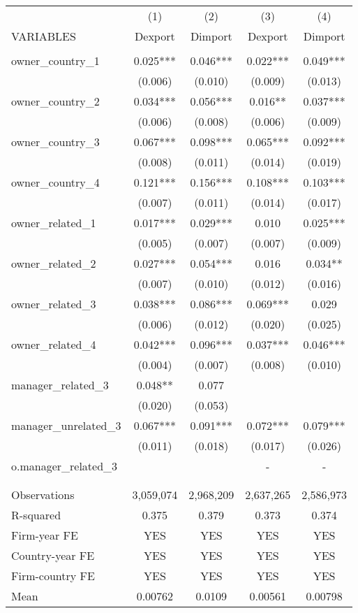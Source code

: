 \begin{tabular}{lcccc} \hline
 & (1) & (2) & (3) & (4) \\
VARIABLES & Dexport & Dimport & Dexport & Dimport \\ \hline
 &  &  &  &  \\
owner\_country\_1 & 0.025*** & 0.046*** & 0.022*** & 0.049*** \\
 & (0.006) & (0.010) & (0.009) & (0.013) \\
owner\_country\_2 & 0.034*** & 0.056*** & 0.016** & 0.037*** \\
 & (0.006) & (0.008) & (0.006) & (0.009) \\
owner\_country\_3 & 0.067*** & 0.098*** & 0.065*** & 0.092*** \\
 & (0.008) & (0.011) & (0.014) & (0.019) \\
owner\_country\_4 & 0.121*** & 0.156*** & 0.108*** & 0.103*** \\
 & (0.007) & (0.011) & (0.014) & (0.017) \\
owner\_related\_1 & 0.017*** & 0.029*** & 0.010 & 0.025*** \\
 & (0.005) & (0.007) & (0.007) & (0.009) \\
owner\_related\_2 & 0.027*** & 0.054*** & 0.016 & 0.034** \\
 & (0.007) & (0.010) & (0.012) & (0.016) \\
owner\_related\_3 & 0.038*** & 0.086*** & 0.069*** & 0.029 \\
 & (0.006) & (0.012) & (0.020) & (0.025) \\
owner\_related\_4 & 0.042*** & 0.096*** & 0.037*** & 0.046*** \\
 & (0.004) & (0.007) & (0.008) & (0.010) \\
manager\_related\_3 & 0.048** & 0.077 &  &  \\
 & (0.020) & (0.053) &  &  \\
manager\_unrelated\_3 & 0.067*** & 0.091*** & 0.072*** & 0.079*** \\
 & (0.011) & (0.018) & (0.017) & (0.026) \\
o.manager\_related\_3 &  &  & - & - \\
 &  &  &  &  \\
 &  &  &  &  \\
Observations & 3,059,074 & 2,968,209 & 2,637,265 & 2,586,973 \\
R-squared & 0.375 & 0.379 & 0.373 & 0.374 \\
Firm-year FE & YES & YES & YES & YES \\
Country-year FE & YES & YES & YES & YES \\
Firm-country FE & YES & YES & YES & YES \\
 Mean & 0.00762 & 0.0109 & 0.00561 & 0.00798 \\ \hline
\end{tabular}
